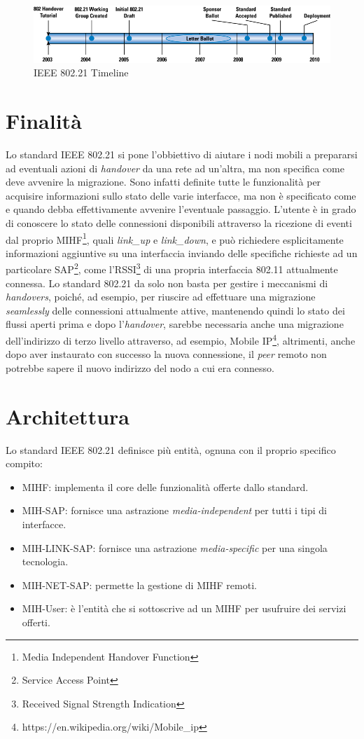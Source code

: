 \begin{figure}[h!]
\centering
\includegraphics[scale=0.48]{ieee_timeline.jpg}
\caption{IEEE 802.21 Timeline}
\end{figure}

\section{Finalità}
Lo standard IEEE 802.21 si pone l'obbiettivo di aiutare i nodi mobili a prepararsi ad eventuali azioni di {\em handover} da una rete ad un'altra, ma non specifica come deve avvenire la migrazione. Sono infatti definite tutte le funzionalità per acquisire informazioni sullo stato delle varie interfacce, ma non è specificato come e quando debba effettivamente avvenire l'eventuale passaggio. L'utente è in grado di conoscere lo stato delle connessioni disponibili attraverso la ricezione di eventi dal proprio MIHF\footnote{Media Independent Handover Function}, quali {\em link\_up} e {\em link\_down}, e può richiedere esplicitamente informazioni aggiuntive su una interfaccia inviando delle specifiche richieste ad un particolare SAP\footnote{Service Access Point}, come l'RSSI\footnote{Received Signal Strength Indication} di una propria interfaccia 802.11 attualmente connessa. Lo standard 802.21 da solo non basta per gestire i meccanismi di {\em handovers}, poiché, ad esempio, per riuscire ad effettuare una migrazione {\em seamlessly} delle connessioni attualmente attive, mantenendo quindi lo stato dei flussi aperti prima e dopo l'{\em handover}, sarebbe necessaria anche una migrazione dell'indirizzo di terzo livello attraverso, ad esempio, Mobile IP\footnote{https://en.wikipedia.org/wiki/Mobile\_ip}, altrimenti, anche dopo aver instaurato con successo la nuova connessione, il {\em peer} remoto non potrebbe sapere il nuovo indirizzo del nodo a cui era connesso.

\section{Architettura}
Lo standard IEEE 802.21 definisce più entità, ognuna con il proprio specifico compito:
\begin{itemize}
\item MIHF: implementa il core delle funzionalità offerte dallo standard.
\item MIH-SAP: fornisce una astrazione {\em media-independent} per tutti i tipi di interfacce.
\item MIH-LINK-SAP: fornisce una astrazione {\em media-specific} per una singola tecnologia.
\item MIH-NET-SAP: permette la gestione di MIHF remoti.
\item MIH-User: è l'entità che si sottoscrive ad un MIHF per usufruire dei servizi offerti.
\end{itemize}

